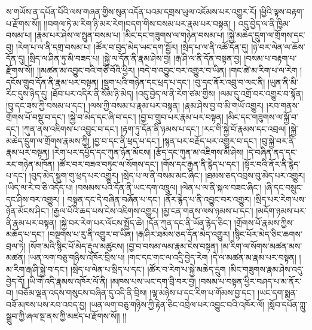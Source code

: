 ས་གཡོས་ན་དཔོན་པོའི་ལས་གཞན་གྱིས་སུན་འདོན་པའམ་དགྲས་ཡུལ་འཇོམས་པར་འགྱུར་རོ། །ཕྱིའི་ལྟས་བརྟག་པ་རྫོགས་སོ།། །།བགལ་ཏེ་མ་རིག་ཉི་མར་རེག།བདག་གིས་བསམ་པར་རྣམ་པར་བསྟན། ། འདུ་བྱེད་ལ་ནི་ཁྱིམ་བསམ་པ། །རྣམ་པར་ཤེས་ལ་སྤུན་བསམ་པ། །མིང་དང་གཟུགས་ལ་གཉེན་བསམ་པ། །སྐྱེ་མཆེད་དྲུག་ལ་གྲོགས་དང་བུ། །རེག་པ་ལ་ནི་དགྲ་བསམ་པ། །ཚོར་བ་བུད་མེད་ཡང་དག་སྦྱོར། །སྲེད་པ་ལ་ནི་འཚོ་དོན་དུ། །ཉེ་བར་ལེན་ལ་ཆོས་དོན་དུ། །སྲིད་ལ་ཤིན་ཏུ་མི་བཟད་པ། །སྐྱེ་ལ་དོན་ནི་རྣམ་ཤེས་བྱ། །རྒ་ཤི་ལ་ནི་དོན་བསྟན་བྱ། །བསམ་པ་བརྟག་པ་རྫོགས་སོ།། །།མཚན་མ་འབྱུང་བའི་གཙོ་བོའི་ཕྱིར། །བདེ་བ་འབྱུང་བར་འགྱུར་བ་ཡིན། །གང་ཚེ་མ་རིག་པ་ལ་རེག །དངོས་གྲུབ་དོན་ནི་རྣམ་པར་བསྟན། །སྡུག་པའི་གཉེན་དང་ཕྲད་པ་དང་། །བུ་དང་ནོར་འབྲུ་བ་ལང་ནི། །ཡུན་ནི་མི་རིང་དུས་ཉིད་དུ། །ཐོབ་པར་འདིར་ནི་སོམ་ཉི་མེད། །འདུ་བྱེད་ལ་ནི་རེག་ཙམ་གྱིས། །ལམ་དུ་འགྲོ་བར་འགྱུར་བ་སྟོན། །བུ་དང་ཟས་ཀྱི་བསམ་པ་དང་། །ལས་ཀྱི་བསམ་པ་རྣམ་པར་བསྟན། །རྣམ་ཤེས་བྱ་བ་མི་གཡོ་འགྱུར། །རབ་གནས་གྲོགས་པོ་བསྡུ་བ་དང་། །སྐྱེ་བ་མེད་དང་ཞི་བ་དང་། །བྱ་བ་གྲུབ་པར་རྣམ་པར་བསྟན། །མིང་དང་གཟུགས་ལ་སྐྱོ་བ་དང་། །ཀུན་ནས་འཇིགས་པ་འབྱུང་བ་དང་། །རྟག་ཏུ་དོན་ནི་ཉམས་པ་དང་། །རང་གི་སྐྱེ་བོ་རྣམས་དང་འབྲལ། །སྐྱེ་མཆེད་དྲུག་ལ་གྲོགས་རྣམས་ཀྱི། །བྱ་བ་དང་ནི་ཕྲད་པ་དང་། །སྙན་པར་བརྗོད་པར་འགྱུར་བ་དང་། །བུ་སྐྱེ་བར་ནི་རྣམ་པར་བསྟན། །རེག་པར་དཔྱོད་དང་ཀུན་ཉོན་མོངས། །རྩོད་དང་ཀུན་མ་འཇིགས་མི་ཤེས། །དེ་བཞིན་ནད་དང་རང་གཉེན་མཁོན། །ཚོར་བར་བཟའ་བཏུང་ལ་སོགས་དང་། །གོས་དང་རྒྱན་ནི་རྙེད་པ་དང་། །སྟོར་བའི་ནོར་ནི་རྙེད་པ་དང་། །བུད་མེད་སྡུག་གུ་ཕྲད་པར་འགྱུར། །སྲེད་པ་ལ་ནི་བསམ་མང་ཞིང་། །ཐམས་ཅད་འབྲས་བུ་མེད་པར་འགྱུར། །ཡིད་ལ་རེ་བ་ཅི་འདོད་པ། །བསམས་པའི་དོན་ནི་ཡང་དག་འཁྲུལ། །ལེན་པ་ལ་ནི་སྐལ་བཟང་ཞིང་། །ཞི་དང་བསྲུང་དང་ཤིས་བར་འགྱུར། །
བསྟན་དང་དེ་བཞིན་བཞོན་པ་དང་། །ནོར་རྙེད་པ་ནི་འབྱུང་བར་འགྱུར། །སྲིད་པར་རེག་པས་ཉོན་མོངས་ཤིང་། །རྒྱལ་པོའི་ཆད་པས་ངེས་འཇིགས་འགྱུར། །མྱ་ངན་གནས་ལས་ཉམས་པ་དང་། །མདོག་ཉམས་པར་ནི་རྣམ་པར་བསྟན། །སྐྱེ་བར་རེག་པར་ལོངས་སྤྱོད་ཆེ། །དོན་ཀུན་དང་ནི་ཡོན་རྙེད་ཅིང་། །གྲོགས་པོ་རྣམས་ཀྱིས་མཆོད་པ་དང་། །བསྔགས་པ་རུ་ནི་འགྱུར་བ་ཡིན། །རྒ་ཤིར་ཐམས་ཅད་དོན་མེད་འགྱུར། །སྙིང་པོར་མེད་ཅིང་ཆགས་བྲལ་ཏེ། །སོག་མའི་སྙིང་པོ་མེད་རྡུལ་མཚུངས། །བྱ་བ་བསམ་ལམ་རྣམ་ངེས་བསྟན། །མ་རིག་ལ་སོགས་མཚན་མས་མཚན། །ཡན་ལག་བཅུ་གཉིས་འཁོར་བྲིས་པ། །གང་དང་གང་ལ་འདྲི་བྱེད་རེག །དེ་ལ་མཚན་མ་རྣམ་པར་བསྟན། །མ་རིག་རྒ་ཤི་སྐྱེ་བ་དང་། །སྲེད་པ་ལེན་པ་སྲིད་པ་དང་། །ཚོར་བ་རེག་པ་སྐྱེ་མཆེད་དྲུག །མིང་གཟུགས་རྣམ་ཤེས་འདུ་བྱེད་དོ། །ཡི་གེ་འདི་རྣམས་འཁོར་ལོ་ནི། །མཁས་པས་ཡང་དག་བྲི་བར་བྱ། །བསམ་པ་བསྟན་ཕྱིར་བཤད་པ་མ་ནོར་བ། །བཅོམ་ལྡན་འདས་གསུངས་བཞིན་དུ་འདི་ནི་བྲིས། །ལྷ་མཉེས་པ་དང་རིག་པ་གོམས་བྱ་དང་། །ཡང་དག་སྨན་བཟོ་མཁས་པས་རབ་འབད་བྱ། །ཡན་ལག་བཅུ་གཉིས་ཀྱི་རྟེན་ཅིང་འབྲེལ་པར་འབྱུང་བའི་འཁོར་ལོ། །སློབ་དཔོན་ཀླུ་སྒྲུབ་ཀྱི་ཞལ་སྔ་ནས་ཀྱི་མཛད་པ་རྫོགས་སོ།། །།
